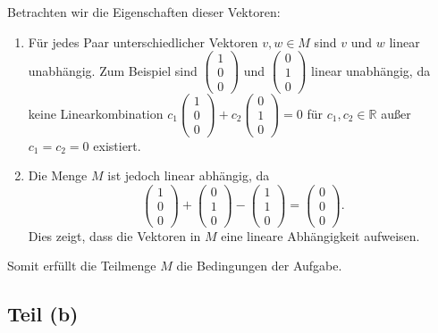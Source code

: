 \documentclass[11pt]{article}
\begin{document}
Betrachten wir die Eigenschaften dieser Vektoren:

\begin{enumerate}
    \item Für jedes Paar unterschiedlicher Vektoren \( v, w \in M \) sind \( v \) und \( w \) linear unabhängig. Zum Beispiel sind \( \begin{pmatrix} 1 \\ 0 \\ 0 \end{pmatrix} \) und \( \begin{pmatrix} 0 \\ 1 \\ 0 \end{pmatrix} \) linear unabhängig, da keine Linearkombination \( c_1 \begin{pmatrix} 1 \\ 0 \\ 0 \end{pmatrix} + c_2 \begin{pmatrix} 0 \\ 1 \\ 0 \end{pmatrix} = 0 \) für \( c_1, c_2 \in \mathbb{R} \) außer \( c_1 = c_2 = 0 \) existiert.

    \item Die Menge \( M \) ist jedoch linear abhängig, da
    \[
    \begin{pmatrix} 1 \\ 0 \\ 0 \end{pmatrix} + \begin{pmatrix} 0 \\ 1 \\ 0 \end{pmatrix} - \begin{pmatrix} 1 \\ 1 \\ 0 \end{pmatrix} = \begin{pmatrix} 0 \\ 0 \\ 0 \end{pmatrix}.
    \]
    Dies zeigt, dass die Vektoren in \( M \) eine lineare Abhängigkeit aufweisen.
\end{enumerate}

Somit erfüllt die Teilmenge \( M \) die Bedingungen der Aufgabe.

\subsection*{Teil (b)}
\end{document}
